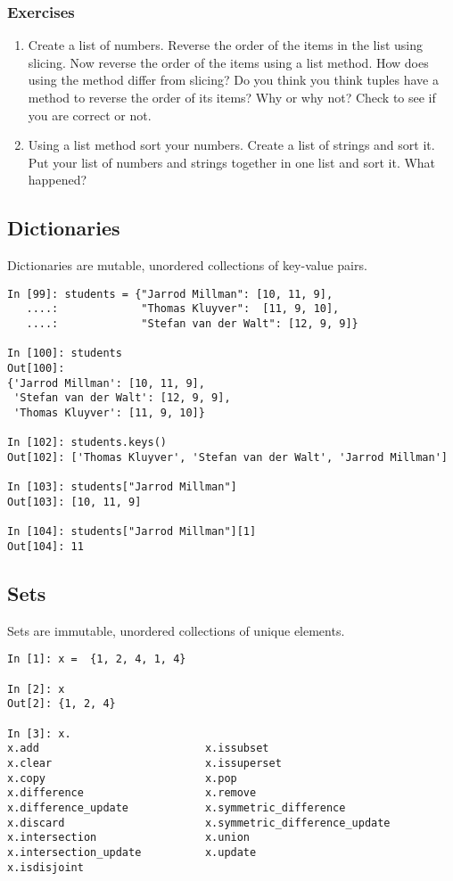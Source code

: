 \subsubsection{Exercises}
\begin{enumerate}
\item Create a list of numbers.  Reverse the order of the items in the list
  using slicing.  Now reverse the order of the items using a list method.
  How does using the method differ from slicing?  Do you think you think
  tuples have a method to reverse the order of its items?  Why or why not?
  Check to see if you are correct or not.
\item Using a list method sort your numbers.  Create a list of strings and
  sort it.  Put your list of numbers and strings together in one list and
  sort it.  What happened?
\end{enumerate}


\subsection{Dictionaries}

Dictionaries are mutable, unordered collections of key-value pairs.

\begin{verbatim}
In [99]: students = {"Jarrod Millman": [10, 11, 9],
   ....:             "Thomas Kluyver":  [11, 9, 10],
   ....:             "Stefan van der Walt": [12, 9, 9]}

In [100]: students
Out[100]: 
{'Jarrod Millman': [10, 11, 9],
 'Stefan van der Walt': [12, 9, 9],
 'Thomas Kluyver': [11, 9, 10]}

In [102]: students.keys()
Out[102]: ['Thomas Kluyver', 'Stefan van der Walt', 'Jarrod Millman']

In [103]: students["Jarrod Millman"]
Out[103]: [10, 11, 9]

In [104]: students["Jarrod Millman"][1]
Out[104]: 11
\end{verbatim}

\subsection{Sets}

Sets are immutable, unordered collections of unique elements.

\begin{verbatim}
In [1]: x =  {1, 2, 4, 1, 4}

In [2]: x
Out[2]: {1, 2, 4}

In [3]: x.
x.add                          x.issubset
x.clear                        x.issuperset
x.copy                         x.pop
x.difference                   x.remove
x.difference_update            x.symmetric_difference
x.discard                      x.symmetric_difference_update
x.intersection                 x.union
x.intersection_update          x.update
x.isdisjoint                   
\end{verbatim}

